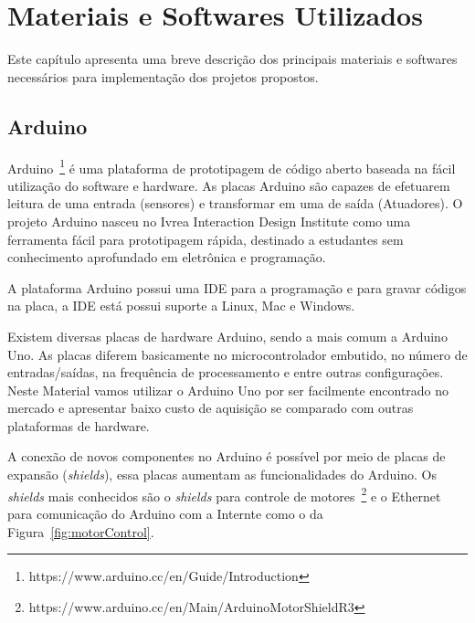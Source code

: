 %
\chapter{Materiais e Softwares Utilizados} \label{MateSof}

Este capítulo apresenta uma breve descrição dos principais materiais e softwares necessários para implementação dos projetos propostos.  

\section{Arduino}

Arduino~\footnote{https://www.arduino.cc/en/Guide/Introduction} é uma plataforma de prototipagem de código aberto baseada na fácil utilização do software e hardware. As placas Arduino são capazes de efetuarem leitura de uma entrada (sensores) e transformar em uma de saída (Atuadores). O projeto Arduino nasceu no Ivrea Interaction Design Institute como uma ferramenta fácil para prototipagem rápida, destinado a estudantes sem conhecimento aprofundado em eletrônica e programação. 

A plataforma Arduino possui uma IDE para a programação e para gravar códigos na placa, a IDE está possui suporte a Linux, Mac e Windows. 

Existem diversas placas de hardware Arduino, sendo a mais comum a Arduino Uno. As placas diferem basicamente no microcontrolador embutido, no número de entradas/saídas, na frequência de processamento e entre outras configurações.
Neste Material vamos utilizar o Arduino Uno por ser facilmente encontrado no mercado e apresentar baixo custo de aquisição se comparado com outras plataformas de hardware.

A conexão de novos componentes no Arduino é possível por meio de placas de expansão (\textit{shields}), essa placas aumentam as funcionalidades do Arduino. Os \textit{shields} mais conhecidos são o \textit{shields} para controle de motores~\footnote{https://www.arduino.cc/en/Main/ArduinoMotorShieldR3} e o Ethernet para comunicação do Arduino com a Internte como o da Figura~\ref{fig:motorControl}.  

